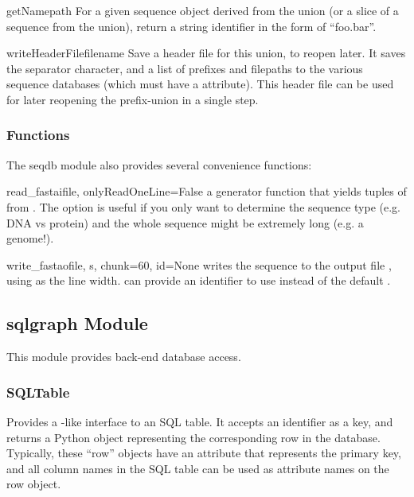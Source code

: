 \documentclass{howto}
\begin{document}
\begin{funcdesc}{getName}{path}
  For a given sequence object  derived from the union
  (or a slice of a sequence from the union), return a string identifier
  in the form of ``foo.bar''.
\end{funcdesc}

\begin{funcdesc}{writeHeaderFile}{filename}
  Save a header file for this union, to reopen later.
  It saves the separator character, and a list of prefixes
  and filepaths to the various sequence databases (which
  must have a  attribute).  This header
  file can be used for later reopening the prefix-union
  in a single step.
\end{funcdesc}

\subsubsection{Functions}
The seqdb module also provides several convenience functions:

\begin{funcdesc}{read_fasta}{ifile, onlyReadOneLine=False}
  a generator function
  that yields tuples of  from .  
  The  option is useful if you only want to 
  determine the sequence type (e.g. DNA vs protein) and the
  whole sequence might be extremely long (e.g. a genome!).
\end{funcdesc}

\begin{funcdesc}{write_fasta}{ofile, s, chunk=60, id=None}
  writes the sequence 
  to the output file , using  as the line width.
   can provide an identifier to use instead of the default 
  .
\end{funcdesc}

\subsection{sqlgraph Module}
\label{sqlgraph-module}
This module provides back-end database access.

\subsubsection{SQLTable}
Provides a -like interface to an SQL table.  It accepts
an identifier as a key, and returns a Python object representing
the corresponding row in the database.  Typically, these ``row''
objects have an  attribute that represents the
primary key, and all column names in the SQL table can be
used as attribute names on the row object. 
\end{document}
